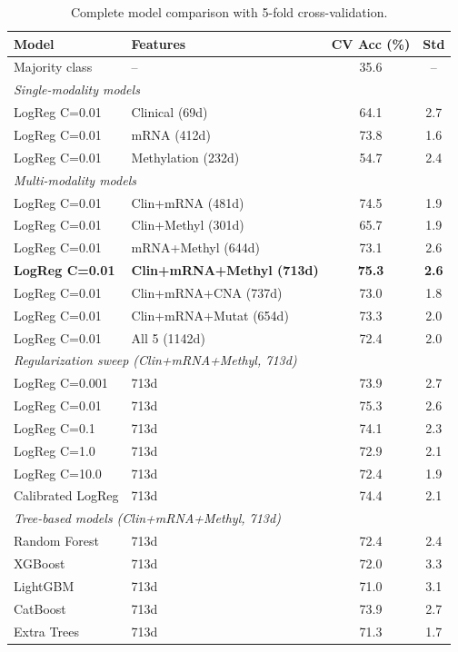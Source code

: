 \documentclass[11pt,a4paper]{article}
\begin{document}
\begin{table}[H]
\centering
\caption{Complete model comparison with 5-fold cross-validation.}
\label{supp:tab:full_comparison}
\begin{tabular}{llcc}
\toprule
\textbf{Model} & \textbf{Features} & \textbf{CV Acc (\%)} & \textbf{Std} \\
\midrule
Majority class & -- & 35.6 & -- \\
\midrule
\multicolumn{4}{l}{\textit{Single-modality models}} \\
LogReg C=0.01 & Clinical (69d) & 64.1 & 2.7 \\
LogReg C=0.01 & mRNA (412d) & 73.8 & 1.6 \\
LogReg C=0.01 & Methylation (232d) & 54.7 & 2.4 \\
\midrule
\multicolumn{4}{l}{\textit{Multi-modality models}} \\
LogReg C=0.01 & Clin+mRNA (481d) & 74.5 & 1.9 \\
LogReg C=0.01 & Clin+Methyl (301d) & 65.7 & 1.9 \\
LogReg C=0.01 & mRNA+Methyl (644d) & 73.1 & 2.6 \\
\textbf{LogReg C=0.01} & \textbf{Clin+mRNA+Methyl (713d)} & \textbf{75.3} & \textbf{2.6} \\
LogReg C=0.01 & Clin+mRNA+CNA (737d) & 73.0 & 1.8 \\
LogReg C=0.01 & Clin+mRNA+Mutat (654d) & 73.3 & 2.0 \\
LogReg C=0.01 & All 5 (1142d) & 72.4 & 2.0 \\
\midrule
\multicolumn{4}{l}{\textit{Regularization sweep (Clin+mRNA+Methyl, 713d)}} \\
LogReg C=0.001 & 713d & 73.9 & 2.7 \\
LogReg C=0.01 & 713d & 75.3 & 2.6 \\
LogReg C=0.1 & 713d & 74.1 & 2.3 \\
LogReg C=1.0 & 713d & 72.9 & 2.1 \\
LogReg C=10.0 & 713d & 72.4 & 1.9 \\
Calibrated LogReg & 713d & 74.4 & 2.1 \\
\midrule
\multicolumn{4}{l}{\textit{Tree-based models (Clin+mRNA+Methyl, 713d)}} \\
Random Forest & 713d & 72.4 & 2.4 \\
XGBoost & 713d & 72.0 & 3.3 \\
LightGBM & 713d & 71.0 & 3.1 \\
CatBoost & 713d & 73.9 & 2.7 \\
Extra Trees & 713d & 71.3 & 1.7 \\

\end{tabular}
\end{table}
\end{document}
